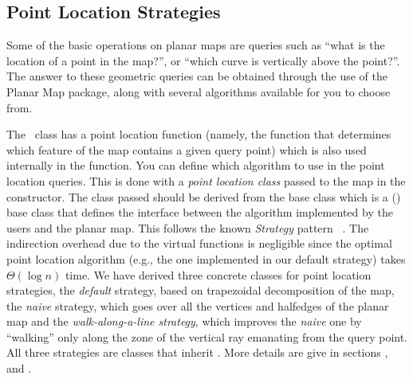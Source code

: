 \subsection{Point Location Strategies}
\label{PM_sec:point_location}
Some of the basic operations on planar maps are queries such as ``what
is the location of a point in the map?'', or ``which curve is
vertically above the point?''. The answer to these geometric queries can
be obtained through the use of the Planar Map package, along with several
algorithms available for you to choose from.

The \ccClassTemplateName\ class has a point location function
(namely, the  function that determines which feature of the map 
contains a given query point)
which is also used internally in the  function.
You can define which algorithm to use in the
point location queries. This is done with a {\em point location class}
passed to the map in the constructor. The class passed should be derived
from the base class  which is a
() base class that defines the interface between the 
algorithm implemented by the users and the planar map. This follows the 
known {\it Strategy}
pattern ~\cite{ghjv-dpero-95}. The indirection overhead due to the virtual
functions is negligible since the optimal point location algorithm 
(e.g., the one implemented in our default strategy) takes $\Theta(\log n)$ time.
We have derived three concrete classes for point location strategies,
the {\it default\/} strategy, based on trapezoidal decomposition of the map,
the {\it naive\/} strategy, which goes over all the vertices and halfedges
of the planar map and the {\it walk-along-a-line strategy\/}, which improves
the {\it naive\/} one by ``walking'' only along the zone of the vertical ray
emanating from the query point. All three strategies are classes
that inherit .
More details are give in sections 
  , 
   and
  .


